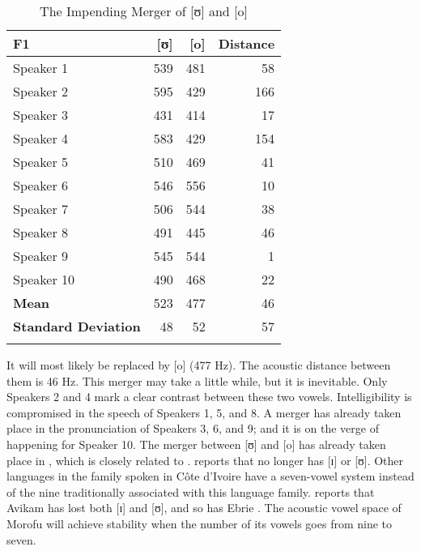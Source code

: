 \documentclass[output=paper,
modfonts
]{langscibook}
\begin{document}
\begin{table}
\caption{The Impending Merger of [ʊ] and [o]}
\label{tab:koffi:6}
\begin{tabularx}{.75\textwidth}{Xrrr}
\lsptoprule
 {\textbf{F1}} &  {[ʊ]} &  {[o]} &  {Distance}\\
\midrule 
 {Speaker 1} &  {539} &  {481} &  {58}\\
 {Speaker 2} &  {595} &  {429} &  {166}\\
 {Speaker 3} &  {431} &  {414} &  {17}\\
 {Speaker 4} &  {583} &  {429} &  {154}\\
 {Speaker 5} &  {510} &  {469} &  {41}\\
 {Speaker 6} &  {546} &  {556} &  {10}\\
 {Speaker 7} &  {506} &  {544} &  {38}\\
 {Speaker 8} &  {491} &  {445} &  {46}\\
 {Speaker 9} &  {545} &  {544} &  {1}\\
 {Speaker 10} &  {490} &  {468} &  {22}\\
\midrule 
 {\textbf{Mean}} &  {523} &  {477} &  {46}\\
 {\textbf{Standard Deviation}} &  {48} &  {52} &  {57}\\
\lspbottomrule
\end{tabularx}
\end{table}

{It will most likely be replaced by [o] (477 Hz). The acoustic distance between them is 46 Hz. This merger may take a little while, but it is inevitable. Only Speakers 2 and 4 mark a clear contrast between these two vowels. Intelligibility is compromised in the speech of Speakers 1, 5, and 8. A merger has already taken place in the pronunciation of Speakers 3, 6, and 9; and it is on the verge of happening for Speaker 10. The merger between [ʊ] and [o] has already taken place in , which is closely related to . \citet[284]{Kouadio1983} reports that  no longer has [ɪ] or [ʊ]. Other languages in the  family spoken in Côte d’Ivoire have a seven-vowel system instead of the nine traditionally associated with this language family. \citet[262]{Hérault1983} reports that Avikam has lost both [ɪ] and [ʊ], and so has Ebrie \citep[324]{Bole-Richard1983}. The acoustic vowel space of  Morofu will achieve stability when the number of its vowels goes from nine to seven.} 
\end{document}
